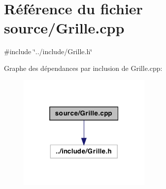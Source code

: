 \hypertarget{a00004}{
\section{Référence du fichier source/Grille.cpp}
\label{a00004}
}
{\ttfamily \#include \char`\"{}../include/Grille.h\char`\"{}}\par
Graphe des dépendances par inclusion de Grille.cpp:
\nopagebreak
\begin{figure}[H]
\begin{center}
\leavevmode
\includegraphics[width=184pt]{a00011}
\end{center}
\end{figure}
